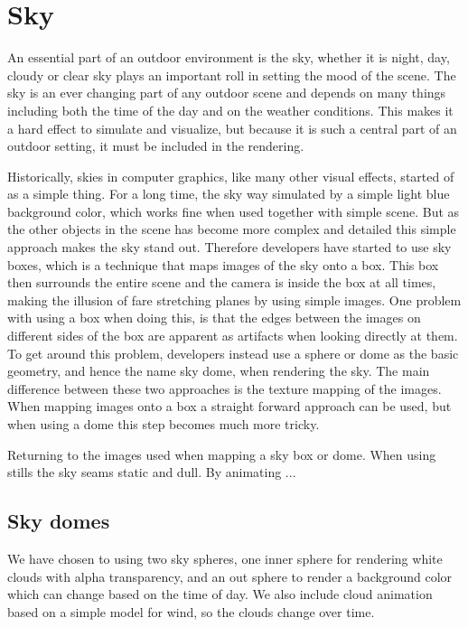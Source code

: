 
\chapter{Sky}
An essential part of an outdoor environment is the sky, whether it is
night, day, cloudy or clear sky plays an important roll in setting the
mood of the scene. The sky is an ever changing part of any outdoor scene
and depends on many things including both the time of the day and on the
weather conditions.
%
This makes it a hard effect to simulate and visualize, but because it
is such a central part of an outdoor setting, it must be included in
the rendering.

Historically, skies in computer graphics, like many other visual
effects, started of as a simple thing. For a long time, the sky way
simulated by a simple light blue background color, which works fine
when used together with simple scene. But as the other objects in the
scene has become more complex and detailed this simple approach makes the
sky stand out. Therefore developers have started to use sky boxes,
which is a technique that maps images of the sky onto a box. This box
then surrounds the entire scene and the camera is inside the box at
all times, making the illusion of fare stretching planes by using
simple images.
%
One problem with using a box when doing this, is that the edges between the
images on different sides of the box are apparent as artifacts when
looking directly at them. To get around this problem, developers
instead use a sphere or dome as the basic geometry, and hence the name
sky dome, when rendering the sky. The main difference between these
two approaches is the texture mapping of the images. When mapping
images onto a box a straight forward approach can be used, but when
using a dome this step becomes much more tricky.

Returning to the images used when mapping a sky box or dome. When
using stills the sky seams static and dull. By animating ...

\section{Sky domes}
We have chosen to using two sky spheres, one inner sphere for
rendering white clouds with alpha transparency, and an out sphere to
render a background color which can change based on the time of day.
We also include cloud animation based on a simple model for wind, so
the clouds change over time.


